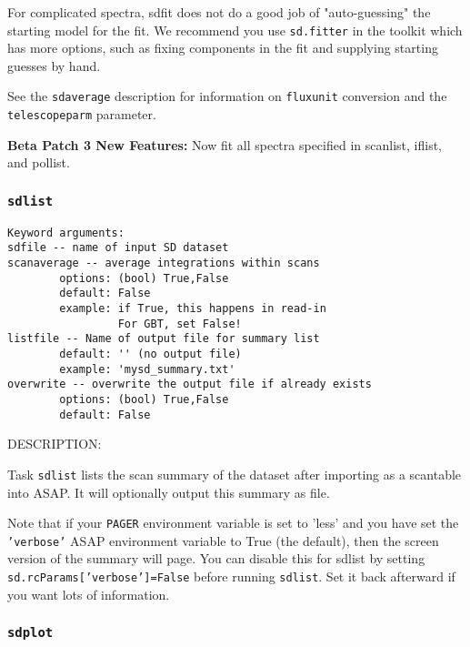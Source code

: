     For complicated spectra, sdfit does not do a good job of
    "auto-guessing" the starting model for the fit.  We recommend
    you use {\tt sd.fitter} in the toolkit which has more options, such
    as fixing components in the fit and supplying starting guesses
    by hand.


    See the {\tt sdaverage} description for information on {\tt fluxunit} 
    conversion and the {\tt telescopeparm} parameter.

    {\bf Beta Patch 3 New Features:}
    Now fit all spectra specified in scanlist, iflist, and pollist.

\subsubsection{{\tt sdlist}}
\label{section:sd.sdtasks.tasks.sdlist}

\begin{verbatim}
Keyword arguments:
sdfile -- name of input SD dataset
scanaverage -- average integrations within scans
        options: (bool) True,False
        default: False
        example: if True, this happens in read-in
                 For GBT, set False!
listfile -- Name of output file for summary list
        default: '' (no output file)
        example: 'mysd_summary.txt'
overwrite -- overwrite the output file if already exists
        options: (bool) True,False
        default: False
\end{verbatim}
    
    DESCRIPTION:
    
    Task {\tt sdlist} lists the scan summary of the dataset after importing
    as a scantable into ASAP.  It will optionally output this summary
    as file.
    
    Note that if your {\tt PAGER} environment variable is set to 'less' and
    you have set the {\tt 'verbose'} ASAP environment variable to True
    (the default), then the screen version of the summary will page.
    You can disable this for sdlist by setting
         {\tt sd.rcParams['verbose']=False}
    before running {\tt sdlist}.  Set it back afterward if you want lots
    of information.

\subsubsection{{\tt sdplot}}
\label{section:sd.sdtasks.tasks.sdplot}

